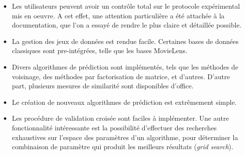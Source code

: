 \begin{itemize}
  \item Les utilisateurs peuvent avoir un contrôle total sur le protocole
    expérimental mis en oeuvre. A cet effet, une attention particulière a été
    attachée à la documentation, que l'on a essayé de rendre le plus claire
    et détaillée possible.
  \item La gestion des jeux de données est rendue facile. Certaines bases de
    données classiques sont pre-intégrées, telle que les bases MovieLens.
  \item Divers algorithmes de prédiction sont implémentés, tels que les
    méthodes de voisinage, des méthodes par factorisation de matrice, et
    d'autres. D'autre part, plusieurs mesures de similarité sont disponibles
    d'office.
  \item Le création de nouveaux algorithmes de prédiction est extrêmement simple.
  \item Les procédure de validation croisée sont faciles à implémenter. Une autre
    fonctionnalité intéressante est la possibilité d'effectuer des recherches
    exhaustives sur l'espace des paramètres d'un algorithme, pour déterminer la
    combinaison de paramètre qui produit les meilleurs résultats (\textit{grid
    search}).
\end{itemize}

